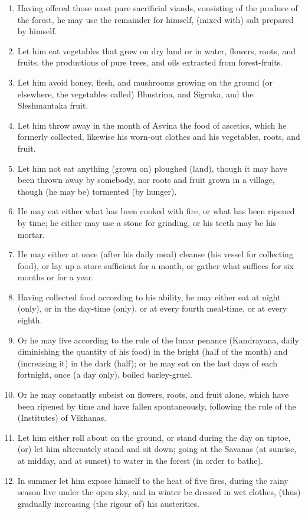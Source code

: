 \begin{enumerate}
\item Having offered those most pure sacrificial viands, consisting of the produce of the forest, he may use the remainder for himself, (mixed with) salt prepared by himself.
\item Let him eat vegetables that grow on dry land or in water, flowers, roots, and fruits, the productions of pure trees, and oils extracted from forest-fruits.
\item Let him avoid honey, flesh, and mushrooms growing on the ground (or elsewhere, the vegetables called) Bhustrina, and Sigruka, and the Sleshmantaka fruit.
\item Let him throw away in the month of Asvina the food of ascetics, which he formerly collected, likewise his worn-out clothes and his vegetables, roots, and fruit.
\item Let him not eat anything (grown on) ploughed (land), though it may have been thrown away by somebody, nor roots and fruit grown in a village, though (he may be) tormented (by hunger).
\item He may eat either what has been cooked with fire, or what has been ripened by time; he either may use a stone for grinding, or his teeth may be his mortar.
\item He may either at once (after his daily meal) cleanse (his vessel for collecting food), or lay up a store sufficient for a month, or gather what suffices for six months or for a year.
\item Having collected food according to his ability, he may either eat at night (only), or in the day-time (only), or at every fourth meal-time, or at every eighth.
\item Or he may live according to the rule of the lunar penance (Kandrayana, daily diminishing the quantity of his food) in the bright (half of the month) and (increasing it) in the dark (half); or he may eat on the last days of each fortnight, once (a day only), boiled barley-gruel.
\item Or he may constantly subsist on flowers, roots, and fruit alone, which have been ripened by time and have fallen spontaneously, following the rule of the (Institutes) of Vikhanas.
\item Let him either roll about on the ground, or stand during the day on tiptoe, (or) let him alternately stand and sit down; going at the Savanas (at sunrise, at midday, and at sunset) to water in the forest (in order to bathe).
\item In summer let him expose himself to the heat of five fires, during the rainy season live under the open sky, and in winter be dressed in wet clothes, (thus) gradually increasing (the rigour of) his austerities.

\end{enumerate}
